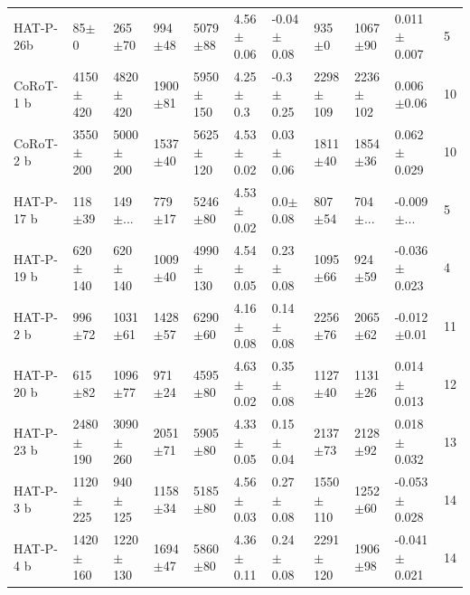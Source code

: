 \begin{subappendices}
{\begin{landscape}
\begin{longtable}{lllllllllll}
HAT-P-26b     &        85$\pm$0 &      265$\pm$70 &    994$\pm$48 &    5079$\pm$88 &  4.56$\pm$0.06 &  -0.04$\pm$0.08 &          935$\pm$0 &        1067$\pm$90 &   0.011$\pm$0.007 &  5 \\
CoRoT-1 b   &    4150$\pm$420 &    4820$\pm$420 &   1900$\pm$81 &   5950$\pm$150 &   4.25$\pm$0.3 &   -0.3$\pm$0.25 &       2298$\pm$109 &       2236$\pm$102 &    0.006$\pm$0.06 &         10 \\
CoRoT-2 b   &    3550$\pm$200 &    5000$\pm$200 &   1537$\pm$40 &   5625$\pm$120 &  4.53$\pm$0.02 &   0.03$\pm$0.06 &        1811$\pm$40 &        1854$\pm$36 &   0.062$\pm$0.029 &         10 \\
HAT-P-17 b  &      118$\pm$39 &       149$\pm$... &    779$\pm$17 &    5246$\pm$80 &  4.53$\pm$0.02 &    0.0$\pm$0.08 &         807$\pm$54 &          704$\pm$... &    -0.009$\pm$... &  5 \\
HAT-P-19 b  &     620$\pm$140 &     620$\pm$140 &   1009$\pm$40 &   4990$\pm$130 &  4.54$\pm$0.05 &   0.23$\pm$0.08 &        1095$\pm$66 &         924$\pm$59 &  -0.036$\pm$0.023 &         4 \\
HAT-P-2 b   &      996$\pm$72 &     1031$\pm$61 &   1428$\pm$57 &    6290$\pm$60 &  4.16$\pm$0.08 &   0.14$\pm$0.08 &        2256$\pm$76 &        2065$\pm$62 &   -0.012$\pm$0.01 &          11 \\
HAT-P-20 b  &      615$\pm$82 &     1096$\pm$77 &    971$\pm$24 &    4595$\pm$80 &  4.63$\pm$0.02 &   0.35$\pm$0.08 &        1127$\pm$40 &        1131$\pm$26 &   0.014$\pm$0.013 &         12 \\
HAT-P-23 b  &    2480$\pm$190 &    3090$\pm$260 &   2051$\pm$71 &    5905$\pm$80 &  4.33$\pm$0.05 &   0.15$\pm$0.04 &        2137$\pm$73 &        2128$\pm$92 &   0.018$\pm$0.032 &       13 \\
HAT-P-3 b   &    1120$\pm$225 &     940$\pm$125 &   1158$\pm$34 &    5185$\pm$80 &  4.56$\pm$0.03 &   0.27$\pm$0.08 &       1550$\pm$110 &        1252$\pm$60 &  -0.053$\pm$0.028 &        14 \\
HAT-P-4 b   &    1420$\pm$160 &    1220$\pm$130 &   1694$\pm$47 &    5860$\pm$80 &  4.36$\pm$0.11 &   0.24$\pm$0.08 &       2291$\pm$120 &        1906$\pm$98 &  -0.041$\pm$0.021 &        14 \\

\end{longtable}
\end{landscape}}
\end{subappendices}
